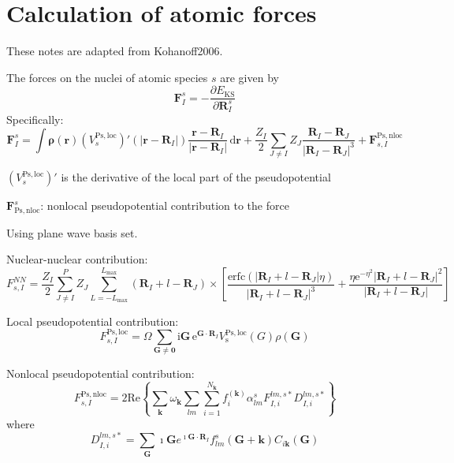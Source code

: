 \section{Calculation of atomic forces}

These notes are adapted from Kohanoff2006.

The forces on the nuclei of atomic species $s$ are given by
\begin{equation}
\mathbf{F}_{I}^{s} = -\frac{\partial E_{\mathrm{KS}}}{\partial\mathbf{R}_{I}^{s}}
\end{equation}
Specifically:
\begin{equation}
\mathbf{F}_{I}^{s} = \int \mathbf{\rho}(\mathbf{r})\left(V^{\mathrm{Ps,loc}}_{s}\right)'
\left(\left| \mathbf{r} - \mathbf{R}_{I} \right|\right)
\frac{\mathbf{r} - \mathbf{R}_{I}}{\left| \mathbf{r} - \mathbf{R}_{I} \right|}
\,\mathrm{d}\mathbf{r} +
\frac{Z_{I}}{2} \sum_{J \neq I} Z_{J}
\frac{\mathbf{R}_{I} - \mathbf{R}_{J}}{\left| \mathbf{R}_{I} - \mathbf{R}_{J} \right|^3} +
\mathbf{F}^{\mathrm{Ps,nloc}}_{s,I}
\end{equation}

$\left( V^{\mathrm{Ps,loc}}_{s} \right)'$ is the derivative of the local part of the pseudopotential

$\mathbf{F}_{\mathrm{Ps,nloc}}^{s}$: nonlocal pseudopotential contribution to the force

Using plane wave basis set.

Nuclear-nuclear contribution:
\begin{equation}
F^{NN}_{s,I} = \frac{Z_{I}}{2}\sum_{J \neq I}^{P} Z_{J}
\sum_{L=-L_{\mathrm{max}}}^{L_{\mathrm{max}}}
\left( \mathbf{R}_{I} + l - \mathbf{R}_{J} \right) \times
\left[
\frac{\mathrm{erfc}\left(\left|\mathbf{R}_{I} + l - \mathbf{R}_{J} \right|\eta\right)}{\left|\mathbf{R}_{I} + l - \mathbf{R}_{J} \right|^3} +
\frac{\eta \mathrm{e}^{-\eta^2}\left|\mathbf{R}_{I} + l - \mathbf{R}_{J} \right|^2}
{\left|\mathbf{R}_{I} + l - \mathbf{R}_{J} \right|}
\right]
\end{equation}

Local pseudopotential contribution:
\begin{equation}
F^{\mathrm{Ps,loc}}_{s,I} = \Omega \sum_{\mathbf{G} \neq \mathbf{0}}
\mathrm{i}\mathbf{G}\,\mathrm{e}^{\mathbf{G}\cdot\mathbf{R}_{I}}
V^{\mathrm{Ps,loc}}_{\mathrm{s}}(G) \rho(\mathbf{G})
\end{equation}

Nonlocal pseudopotential contribution:
\begin{equation}
F^{\mathrm{Ps,nloc}}_{s,I} = 2\mathrm{Re}\left\{
\sum_{\mathbf{k}} \omega_{\mathbf{k}} \sum_{lm} \sum_{i=1}^{N_{\mathbf{k}}}
f^{(\mathbf{k})}_{i}
\alpha^{s}_{lm} F^{lm,s*}_{I,i} D^{lm,s*}_{I,i}
\right\}
\end{equation}
where
\begin{equation}
D^{lm,s*}_{I,i} = \sum_{\mathbf{G}} \imath \mathbf{G}
e^{\imath\mathbf{G}\cdot\mathbf{R}_{I}}
f^{s}_{lm}(\mathbf{G}+\mathbf{k}) C_{i\mathbf{k}}(\mathbf{G})
\end{equation}
